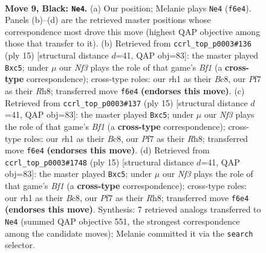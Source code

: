 \documentclass[11pt]{article}
\begin{document}
\clearpage

\begin{figure}[p]\centering
\begin{subfigure}{0.46\textwidth}\centering
\resizebox{\linewidth}{!}{%
\newchessgame
\chessboard[
  setfen={r1bqkb1r/pp3ppp/4pn2/8/3N2PP/8/PPP2P2/R1BQKB1R b KQkq - 0 9},
  showmover=false,
  pgfstyle=straightmove, color=movearrow, markmove={f6-e4}
]}
\caption{}
\end{subfigure}\hfill
\begin{subfigure}{0.46\textwidth}\centering
\resizebox{\linewidth}{!}{%
\newchessgame
\chessboard[
  setfen={r1bqkb1r/pp3ppp/4pn2/2P5/8/3B1N2/PPP2PPP/R1BQK2R b KQkq - 0 8},
  showmover=false,
  pgfstyle=straightmove, color=movearrow, markmove={f8-c5}
]}
\caption{}
\end{subfigure}
\\[4pt]
\begin{subfigure}{0.46\textwidth}\centering
\resizebox{\linewidth}{!}{%
\newchessgame
\chessboard[
  setfen={r1bqkb1r/pp3ppp/4pn2/2P5/8/3B1N2/PPP2PPP/R1BQK2R b KQkq - 0 8},
  showmover=false,
  pgfstyle=straightmove, color=movearrow, markmove={f8-c5}
]}
\caption{}
\end{subfigure}\hfill
\begin{subfigure}{0.46\textwidth}\centering
\resizebox{\linewidth}{!}{%
\newchessgame
\chessboard[
  setfen={r1bqkb1r/pp3ppp/4pn2/2P5/8/3B1N2/PPP2PPP/R1BQK2R b KQkq - 0 8},
  showmover=false,
  pgfstyle=straightmove, color=movearrow, markmove={f8-c5}
]}
\caption{}
\end{subfigure}
\caption{\textbf{Move 9, Black: \texttt{Ne4}.} (a) Our position; Melanie plays \texttt{Ne4} (\texttt{f6e4}). Panels (b)--(d) are the retrieved master positions whose correspondence most drove this move (highest QAP objective among those that transfer to it). (b) Retrieved from \texttt{ccrl\_top\_p0003\#136} (ply 15) [structural distance $d$=41, QAP obj=83]: the master played \texttt{Bxc5}; under $\mu$ our \emph{Nf3} plays the role of that game's \emph{Bf1} (a \textbf{cross-type} correspondence); cross-type roles: our \emph{r}h1 as their \emph{B}c8, our \emph{P}f7 as their \emph{R}h8; transferred move \texttt{f6e4} \textbf{(endorses this move)}. (c) Retrieved from \texttt{ccrl\_top\_p0003\#137} (ply 15) [structural distance $d$=41, QAP obj=83]: the master played \texttt{Bxc5}; under $\mu$ our \emph{Nf3} plays the role of that game's \emph{Bf1} (a \textbf{cross-type} correspondence); cross-type roles: our \emph{r}h1 as their \emph{B}c8, our \emph{P}f7 as their \emph{R}h8; transferred move \texttt{f6e4} \textbf{(endorses this move)}. (d) Retrieved from \texttt{ccrl\_top\_p0003\#1748} (ply 15) [structural distance $d$=41, QAP obj=83]: the master played \texttt{Bxc5}; under $\mu$ our \emph{Nf3} plays the role of that game's \emph{Bf1} (a \textbf{cross-type} correspondence); cross-type roles: our \emph{r}h1 as their \emph{B}c8, our \emph{P}f7 as their \emph{R}h8; transferred move \texttt{f6e4} \textbf{(endorses this move)}. Synthesis: 7 retrieved analogs transferred to \texttt{Ne4} (summed QAP objective 551, the strongest correspondence among the candidate moves); Melanie committed it via the \texttt{search} selector.}
\label{fig:thought-m17}
\end{figure}
\end{document}
